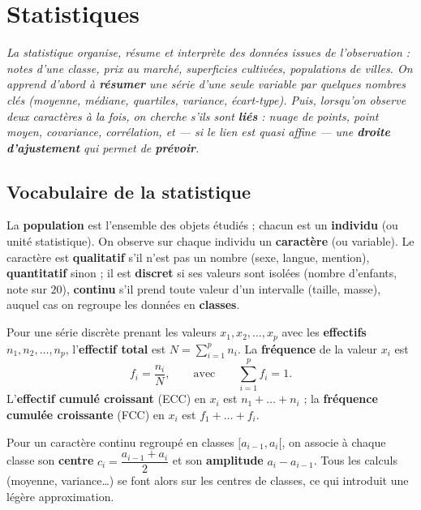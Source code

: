 \chapter{Statistiques}

\noindent\textit{La statistique organise, résume et interprète des données issues
de l'observation : notes d'une classe, prix au marché, superficies cultivées,
populations de villes. On apprend d'abord à \textbf{résumer} une série d'une seule
variable par quelques nombres clés (moyenne, médiane, quartiles, variance,
écart-type). Puis, lorsqu'on observe \emph{deux} caractères à la fois, on cherche
s'ils sont \textbf{liés} : nuage de points, point moyen, covariance, corrélation,
et — si le lien est quasi affine — une \textbf{droite d'ajustement} qui permet de
\textbf{prévoir}.}
\vspace{8pt}

\section{Vocabulaire de la statistique}

\begin{definition}
La \textbf{population} est l'ensemble des objets étudiés ; chacun est un
\textbf{individu} (ou unité statistique). On observe sur chaque individu un
\textbf{caractère} (ou variable). Le caractère est \textbf{qualitatif} s'il n'est
pas un nombre (sexe, langue, mention), \textbf{quantitatif} sinon ; il est
\textbf{discret} si ses valeurs sont isolées (nombre d'enfants, note sur $20$),
\textbf{continu} s'il prend toute valeur d'un intervalle (taille, masse), auquel
cas on regroupe les données en \textbf{classes}.
\end{definition}

\begin{definition}
Pour une série discrète prenant les valeurs $x_1,x_2,\dots,x_p$ avec les
\textbf{effectifs} $n_1,n_2,\dots,n_p$, l'\textbf{effectif total} est
$N=\sum_{i=1}^{p}n_i$. La \textbf{fréquence} de la valeur $x_i$ est
\[
f_i=\frac{n_i}{N},\qquad\text{avec}\qquad \sum_{i=1}^{p}f_i=1 .
\]
L'\textbf{effectif cumulé croissant} (ECC) en $x_i$ est $n_1+\dots+n_i$ ; la
\textbf{fréquence cumulée croissante} (FCC) en $x_i$ est $f_1+\dots+f_i$.
\end{definition}

\begin{remarque}
Pour un caractère continu regroupé en classes $[a_{i-1},a_i[$, on associe à chaque
classe son \textbf{centre} $c_i=\dfrac{a_{i-1}+a_i}{2}$ et son \textbf{amplitude}
$a_i-a_{i-1}$. Tous les calculs (moyenne, variance\dots) se font alors sur les
centres de classes, ce qui introduit une légère approximation.
\end{remarque}

